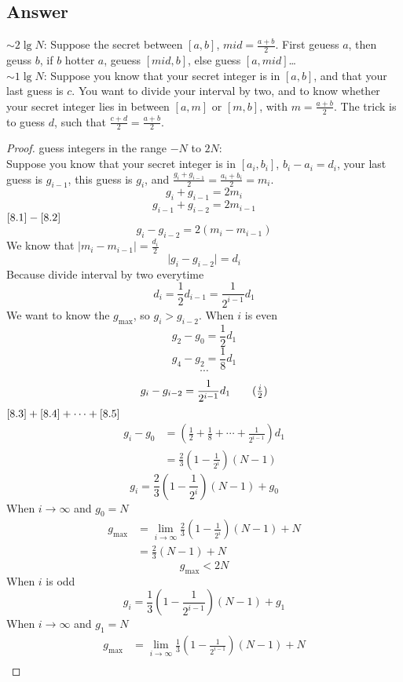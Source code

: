 \subsection*{Answer}
$\sim 2\lg{N}$: Suppose the secret between $[a, b]$, $mid=\frac{a+b}{2}$. First geuess $a$, then geuss $b$,
if $b$ hotter $a$, geuess $[mid, b]$, else guess $[a, mid]$\ldots\\
$\sim 1\lg{N}$: Suppose you know that your secret integer is in $[a,b]$, and that your last guess is $c$.
You want to divide your interval by two, and to know whether your secret integer lies in between $[a, m]$ or
$[m, b]$, with $m=\frac{a+b}{2}$. The trick is to guess $d$, such that $\frac{c+d}{2}=\frac{a+b}{2}$.
\begin{proof}
    guess integers in the range $-N$ to $2N$:\\
    Suppose you know that your secret integer is in $[a_i,b_i]$, $b_i-a_i=d_i$, your last guess
    is $g_{i-1}$, this guess is $g_i$, and $\frac{g_i+g_{i-1}}{2}=\frac{a_i+b_i}{2}=m_i$.
    \[g_i+g_{i-1}=2m_i \tag{1}\label{8.1}\]
    \[g_{i-1}+g_{i-2}=2m_{i-1} \tag{2}\label{8.2}\]
    $\eqref{8.1}-\eqref{8.2}$
    \[g_{i}-g_{i-2}=2(m_i-m_{i-1})\]
    We know that $\mid m_i-m_{i-1} \mid = \frac{d_i}{2}$
    \[\mid g_{i}-g_{i-2}\mid=d_i\]
    Because divide interval by two everytime
    \[d_i=\frac{1}{2}d_{i-1} = \frac{1}{2^{i-1}}d_1 \]
    We want to know the $g_{\max}$, so $g_i>g_{i-2}$. When $i$ is even
    \[g_2-g_0=\frac{1}{2}d_1 \tag{1}\label{8.3}\]
    \[g_4-g_2=\frac{1}{8}d_1 \tag{2}\label{8.4}\]
    \[\cdots\]
    \[g_i-g_{i-2}=\frac{1}{2^{i-1}}d_1 \tag{$\frac{i}{2}$}\label{8.5}\]
    $\eqref{8.3}+\eqref{8.4}+\cdots+\eqref{8.5}$
    \begin{align*}
    g_i-g_0&=(\frac{1}{2}+\frac{1}{8}+\cdots+\frac{1}{2^{i-1}})d_1\\
    &=\frac{2}{3}(1-\frac{1}{2^{i}})(N-1)
    \end{align*}
    \[g_i=\frac{2}{3}(1-\frac{1}{2^i})(N-1)+g_0\]
    When $i \to \infty$ and $g_0=N$
    \begin{align*}
    g_{\max}&=\lim_{i\to\infty}\frac{2}{3}(1-\frac{1}{2^i})(N-1)+N\\
    &=\frac{2}{3}(N-1)+N
    \end{align*}
    \[g_{\max}<2N\]
    When $i$ is odd
    \[g_{i}=\frac{1}{3}(1-\frac{1}{2^{i-1}})(N-1)+g_1\]
    When $i \to \infty$ and $g_1=N$
    \begin{align*}
    g_{\max}&=\lim_{i\to\infty}\frac{1}{3}(1-\frac{1}{2^{i-1}})(N-1)+N\\

\end{align*}
\end{proof}

